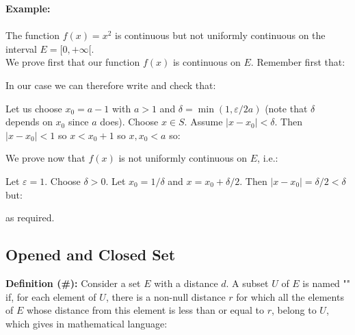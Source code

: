 	
	\begin{tcolorbox}[colframe=black,colback=white,sharp corners]
	\textbf{{\Large {}}Example:}\\\\
	The function $f(x) = x^2$ is continuous but not uniformly continuous
on the interval $E = [0,+\infty[$.\\

	We prove first that our function $f(x)$ is continuous on $E$. Remember first that:
	
	In our case we can therefore write and check that:
	
	
	Let us choose $x_0=a-1$ with $a>1$ and $\delta=\min(1,\varepsilon/2a)$ (note that $\delta$ depends on $x_0$ since $a$ does). Choose $x \in S$. Assume $|x-x_0|<\delta$. Then $|x-x_0|<1$ so $x<x_0+1$ so $x,x_0<a$ so:
	
	We prove now that $f(x)$ is not uniformly continuous on $E$, i.e.:
	
	Let $\varepsilon=1$. Choose $\delta>0$. Let $x_0=1/\delta$ and $x=x_0+\delta/2$. Then $|x-x_0|=\delta/2<\delta$ but:
	
	as required.
	\end{tcolorbox}
	
	\subsection{Opened and Closed Set}
	\textbf{Definition (\#\mydef):} Consider a set $E$ with a distance $d$. A subset $U$ of $E$ is named "" if, for each element of $U$, there is a non-null distance $r$ for which all the elements of $E$ whose distance from this element is less than or equal to $r$, belong to $U$, which gives in mathematical language:
	
